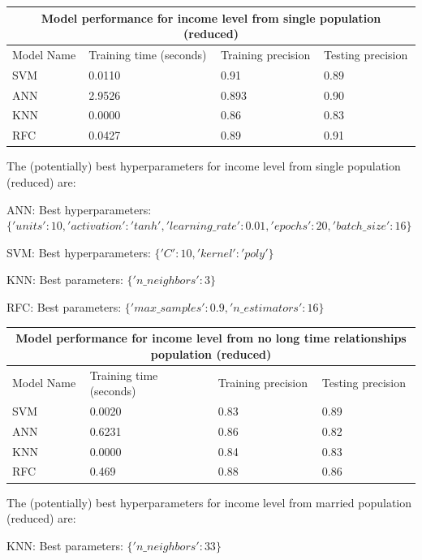 \begin{table}[h!]
    \centering
\begin{tabular}{ |p{3cm}||p{5cm}|p{4cm}|p{4cm}|}
    \hline
    \multicolumn{4}{|c|}{Model performance for income level from single population (reduced)} \\
    \hline
    Model Name& Training time (seconds)& Training precision & Testing precision \\
    \hline
    SVM &0.0110    &0.91&0.89\\
    ANN &2.9526  & 0.893  & 0.90\\
    KNN &0.0000 & 0.86&0.83\\
    RFC &0.0427 & 0.89&0.91\\
    \hline
   \end{tabular}
\end{table}

The (potentially) best hyperparameters for income level from single population (reduced) are:

ANN:
Best hyperparameters: $\{'units': 10, 'activation': 'tanh', 'learning\_rate': 0.01, 'epochs': 20, 'batch\_size': 16\}$

SVM:
Best hyperparameters: $\{'C': 10, 'kernel': 'poly'\}$

KNN:
Best parameters: $\{'n\_neighbors': 3\}$

RFC:
Best parameters: $\{'max\_samples': 0.9, 'n\_estimators': 16\}$

\begin{table}[h!]
    \centering
    \begin{tabular}{ |p{3cm}||p{5cm}|p{4cm}|p{4cm}|}
    \hline
    \multicolumn{4}{|c|}{Model performance for income level from no long time relationships population (reduced)}\\
    \hline
    Model Name& Training time (seconds)& Training precision & Testing precision \\
    \hline
    SVM &0.0020   &0.83&0.89\\
    ANN &0.6231  & 0.86 & 0.82\\
    KNN &0.0000 & 0.84&0.83\\
    RFC & 0.469 & 0.88&0.86\\
    \hline
   \end{tabular}
\end{table}

The (potentially) best hyperparameters for income level from married population (reduced) are:

KNN:
Best parameters: $\{'n\_neighbors': 33\}$


